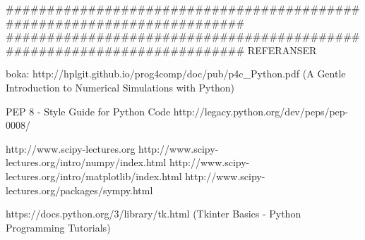 ######################################################################## 
######################################################################## 
REFERANSER

boka: http://hplgit.github.io/prog4comp/doc/pub/p4c_Python.pdf
(A Gentle Introduction to Numerical Simulations with Python)

PEP 8 - Style Guide for Python Code
http://legacy.python.org/dev/peps/pep-0008/ 

http://www.scipy-lectures.org
http://www.scipy-lectures.org/intro/numpy/index.html
http://www.scipy-lectures.org/intro/matplotlib/index.html
http://www.scipy-lectures.org/packages/sympy.html

https://docs.python.org/3/library/tk.html (Tkinter Basics - Python Programming Tutorials)
